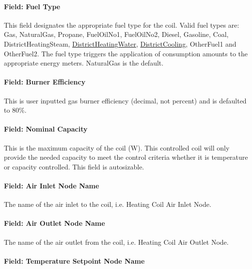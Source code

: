 \paragraph{Field: Fuel Type}

This field designates the appropriate fuel type for the coil. Valid fuel types are: Gas, NaturalGas, Propane, FuelOilNo1, FuelOilNo2, Diesel, Gasoline, Coal, DistrictHeatingSteam, \hyperref[districtheating]{DistrictHeatingWater}, \hyperref[districtcooling]{DistrictCooling}, OtherFuel1 and OtherFuel2. The fuel type triggers the application of consumption amounts to the appropriate energy meters. NaturalGas is the default.

\paragraph{Field: Burner Efficiency}\label{field-gas-burner-efficiency}

This is user inputted gas burner efficiency (decimal, not percent) and is defaulted to 80\%.

\paragraph{Field: Nominal Capacity}\label{field-nominal-capacity-1-000}

This is the maximum capacity of the coil (W). This controlled coil will only provide the needed capacity to meet the control criteria whether it is temperature or capacity controlled. This field is autosizable.

\paragraph{Field: Air Inlet Node Name}\label{field-air-inlet-node-name-6}

The name of the air inlet to the coil, i.e. Heating Coil Air Inlet Node.

\paragraph{Field: Air Outlet Node Name}\label{field-air-outlet-node-name-6-000}

The name of the air outlet from the coil, i.e. Heating Coil Air Outlet Node.

\paragraph{Field: Temperature Setpoint Node Name}\label{field-temperature-setpoint-node-name-4}

